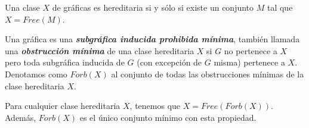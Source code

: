 Una clase $X$ de gráficas es hereditaria si y sólo si existe un conjunto $M$ tal que $X = Free(M)$.

Una gráfica es una \textbf{\emph{subgráfica inducida  prohibida mínima}}, también llamada una \textbf{\emph{obstrucción mínima}} de una clase hereditaria $X$ si $G$ no pertenece a $X$ pero toda subgráfica inducida de $G$ (con excepción de $G$ misma) pertenece a $X$. Denotamos como $Forb(X)$ al conjunto de todas las obstrucciones mínimas de la clase hereditaria $X$. 

Para cualquier clase hereditaria $X$, tenemos que $X = Free(Forb(X))$. Además, $Forb(X)$ es el único conjunto mínimo con esta propiedad. 

